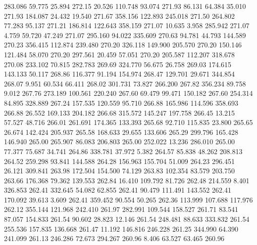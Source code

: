  283.086   59.775   25.894       272.15
  20.526  110.748   93.074       271.93
  86.131   64.384   35.010       271.93
 184.087   24.432   19.540       271.67
 358.156  122.893  245.018       271.50
 264.802   77.283   95.137       271.21
 186.814  122.643  358.159       271.07
  10.635    3.958  285.942       271.07
   4.759   59.720   47.249       271.07
 295.160   94.022  335.609       270.63
  94.781   44.793  144.589       270.23
 356.415  112.874  239.480       270.20
 326.118  149.900  205.570       270.20
 150.146  121.484   58.070       270.20
 297.561   20.459   57.051       270.20
 205.587  112.207  318.678       270.08
 233.102   70.815  282.783       269.69
 324.770   56.675   26.758       269.03
 174.615  143.133   50.117       268.86
 116.377   91.194  154.974       268.47
 129.701   29.671  344.854       268.07
   9.951   60.534   66.411       268.02
 301.731   73.827  266.200       267.82
 356.234   89.758    9.012       267.76
 273.189  100.561  220.240       267.60
  69.479   99.471  150.182       267.60
 254.314   84.895  328.889       267.24
 157.535  120.559   95.710       266.88
 165.986  114.596  358.693       266.88
  26.552  169.133  204.182       266.68
 315.572  145.247  197.758       266.45
  13.215   57.527   48.716       266.01
 261.691  174.365  133.393       265.68
  92.710  115.835   23.800       265.65
  26.674  142.424  205.937       265.58
 168.633   29.655  133.606       265.29
 299.796  165.428  146.940       265.00
 265.907   86.083  206.803       265.00
 252.022   13.236  286.010       265.00
  77.377   75.687   34.741       264.86
 338.781   37.972    5.382       264.57
  85.838   48.262  208.813       264.52
 259.298   93.841  144.588       264.28
 156.963  155.704   51.009       264.23
 296.451   26.121  309.841       263.98
 172.504  154.500   74.129       263.83
 102.354   83.579  203.750       263.66
 176.368   79.362  139.553       262.84
  16.410  109.792   81.726       262.48
 214.559    8.401  326.853       262.41
 332.645   54.082   62.855       262.41
  90.479  111.491  143.552       262.41
 170.092   39.613    3.609       262.41
 359.452   90.554   50.265       262.36
 113.999  107.688  117.976       262.12
 355.144  121.968  242.410       261.97
 282.991  109.544  158.527       261.71
  83.541   87.057  154.833       261.54
  90.602   28.823   12.146       261.54
 248.481   88.633  333.832       261.54
 255.536  157.835  136.668       261.47
  11.192  146.816  246.228       261.25
 344.990   64.390  241.099       261.13
 246.286   72.673  294.267       260.96
   8.406   63.527   63.465       260.96
